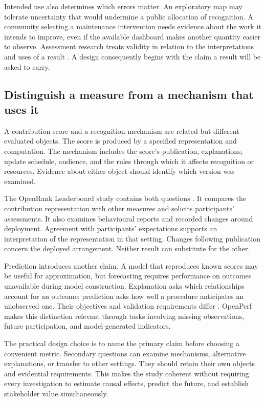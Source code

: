 Intended use also determines which errors matter. An exploratory map may tolerate uncertainty that would undermine a public allocation of recognition. A community selecting a maintenance intervention needs evidence about the work it intends to improve, even if the available dashboard makes another quantity easier to observe. Assessment research treats validity in relation to the interpretations and uses of a result \citep{messick1995}. A design consequently begins with the claim a result will be asked to carry.

\subsection{Distinguish a measure from a mechanism that uses it}
A contribution score and a recognition mechanism are related but different evaluated objects. The score is produced by a specified representation and computation. The mechanism includes the score's publication, explanations, update schedule, audience, and the rules through which it affects recognition or resources. Evidence about either object should identify which version was examined.

The OpenRank Leaderboard study contains both questions \citep{zhao2024}. It compares the contribution representation with other measures and solicits participants' assessments. It also examines behavioural reports and recorded changes around deployment. Agreement with participants' expectations supports an interpretation of the representation in that setting. Changes following publication concern the deployed arrangement. Neither result can substitute for the other.

Prediction introduces another claim. A model that reproduces known scores may be useful for approximation, but forecasting requires performance on outcomes unavailable during model construction. Explanation asks which relationships account for an outcome; prediction asks how well a procedure anticipates an unobserved one. Their objectives and validation requirements differ \citep{shmueli2010}. OpenPerf makes this distinction relevant through tasks involving missing observations, future participation, and model-generated indicators.

The practical design choice is to name the primary claim before choosing a convenient metric. Secondary questions can examine mechanisms, alternative explanations, or transfer to other settings. They should retain their own objects and evidential requirements. This makes the study coherent without requiring every investigation to estimate causal effects, predict the future, and establish stakeholder value simultaneously.

